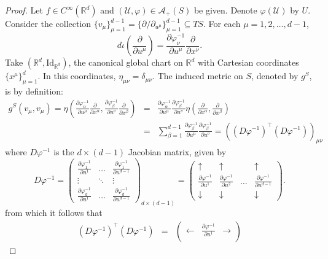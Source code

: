 \documentclass{article}
\newcommand{\p}{\partial}
\newcommand{\R}{\mathbb{R}}
\newcommand{\al}{\alpha}
\newcommand{\be}{\beta}
\newcommand{\f}[2]{\frac{#1}{#2}}
\newcommand{\lp}{\left(}
\newcommand{\rp}{\right)}
\theoremstyle{theorem}
\begin{document}
\begin{proof}
Let $f\in C^\infty(\R^d)$ and $(\mathcal{U}, \varphi) \in \mathcal{A}_+(S)$ be given. Denote $\varphi(\mathcal{U})$ by $U$. Consider the collection $\{ v_\mu \}_{\mu = 1}^{d-1} = \{ \p/\p_{u^\mu} \}_{\mu = 1}^{d-1} \subseteq TS$. For each $\mu = 1,2,\dots,d-1$,
\begin{equation*}
    d\iota\lp \f{\p}{\p u^\mu} \rp = \f{\p \varphi^{-1}_\nu}{\p u^\mu} \f{\p}{\p x^\nu}.
\end{equation*}
Take $(\R^d, \text{Id}_{\R^d})$, the canonical global chart on $\R^d$ with Cartesian coordinates $\{ x^\mu \}_{\mu = 1}^d$. In this coordinates, $\eta_{\mu\nu} = \delta_{\mu\nu}$. The induced metric on $S$, denoted by $g^S$, is by definition:
\begin{eqnarray*}
    g^S(v_\mu, v_\mu) = \eta\lp \f{\p \varphi^{-1}_\al}{\p u^\mu} \f{\p}{\p x^\al}, \f{\p \varphi^{-1}_\be}{\p u^\nu} \f{\p}{\p x^\be} \rp &=& \f{\p \varphi^{-1}_\al}{\p u^\mu}\f{\p \varphi^{-1}_\be}{\p u^\nu} \eta\lp \f{\p}{\p x^\al}, \f{\p}{\p x^\be} \rp\\
    &=& \sum_{\be = 1}^{d-1}\f{\p \varphi^{-1}_\be}{\p u^\mu}\f{\p \varphi^{-1}_\be}{\p u^\nu} = ((D\varphi^{-1})^\top (D\varphi^{-1}))_{\mu\nu}
\end{eqnarray*}
where $D\varphi^{-1}$ is the $d\times (d-1)$ Jacobian matrix, given by
\begin{equation*}
    D\varphi^{-1} = \begin{pmatrix}
    \f{\p \varphi_1^{-1}}{\p u^1} & \dots & \f{\p \varphi_1^{-1}}{\p u^{d-1}} \\
    \vdots &\ddots & \vdots\\
    \f{\p \varphi_{d}^{-1}}{\p u^1} & \dots & \f{\p \varphi_{d}^{-1}}{\p u^{d-1}} 
    \end{pmatrix}_{d\times (d-1)} = \begin{pmatrix}
    \uparrow & \uparrow &   &\uparrow \\ 
    \f{\p \varphi^{-1}}{\p u^1}& \f{\p \varphi^{-1}}{\p u^2}  &\dots&\f{\p \varphi^{-1}}{\p u^{d-1}}\\
    \downarrow  & \downarrow &    &\downarrow     \end{pmatrix}.
\end{equation*}
from which it follows that
\begin{eqnarray*}
    (D\varphi^{-1})^\top (D\varphi^{-1}) &=& \begin{pmatrix}
     \leftarrow & \f{\p \varphi^{-1}}{\p u^1} & \rightarrow \\

\end{pmatrix}
\end{eqnarray*}
\end{proof}
\end{document}
